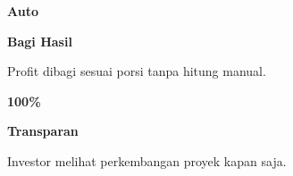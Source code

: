 \documentclass[a4paper]{article}
\begin{document}
\begin{minipage}[t]{0.485\textwidth}
    \noindent\colorbox{BlueBg}{%
        \begin{minipage}[t][2.7cm][c]{\dimexpr\linewidth-2\fboxsep\relax}
            \centering
            {\fontsize{20}{24}\selectfont\bfseries\color{BluePrimary} Auto}\par\vspace{2pt}
            {\fontsize{9.5}{12}\selectfont\bfseries\color{BlueDark} Bagi Hasil}\par\vspace{2pt}
            {\fontsize{8.5}{11}\selectfont\color{TextDark}Profit dibagi sesuai porsi tanpa hitung manual.}
        \end{minipage}}\par
    \vspace{6pt}
    \noindent\colorbox{BlueBg}{%
        \begin{minipage}[t][2.7cm][c]{\dimexpr\linewidth-2\fboxsep\relax}
            \centering
            {\fontsize{20}{24}\selectfont\bfseries\color{BluePrimary} 100\%}\par\vspace{2pt}
            {\fontsize{9.5}{12}\selectfont\bfseries\color{BlueDark} Transparan}\par\vspace{2pt}
            {\fontsize{8.5}{11}\selectfont\color{TextDark}Investor melihat perkembangan proyek kapan saja.}
        \end{minipage}}%
\end{minipage}

\vspace{8pt}
\end{document}
